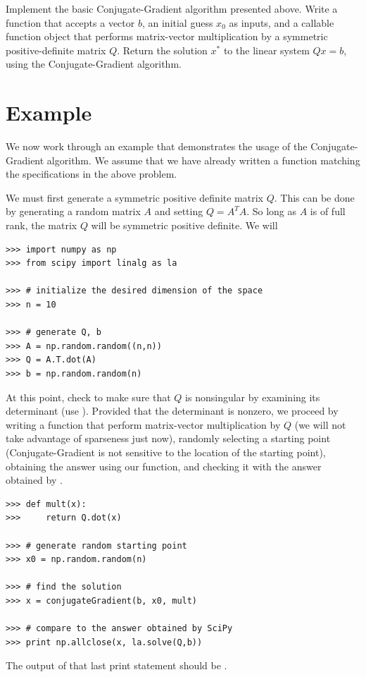 \begin{problem}
Implement the basic Conjugate-Gradient algorithm presented above. Write a function  that accepts a vector $b$, an initial 
guess $x_0$ as inputs, and a callable function
object that performs matrix-vector multiplication by a symmetric positive-definite matrix $Q$. 
Return the solution $x^*$ to the linear system $Qx = b$, using the Conjugate-Gradient algorithm.
\end{problem}

\section*{Example}
We now work through an example that demonstrates the usage of the Conjugate-Gradient algorithm. We assume that we have already written a
function  matching the specifications in the above problem.

We must first generate a symmetric positive definite matrix $Q$. This can be done by generating a random matrix $A$ and setting $Q = A^TA$.
So long as $A$ is of full rank, the matrix $Q$ will be symmetric positive definite. We will 
\begin{lstlisting}
>>> import numpy as np
>>> from scipy import linalg as la

>>> # initialize the desired dimension of the space
>>> n = 10

>>> # generate Q, b
>>> A = np.random.random((n,n))
>>> Q = A.T.dot(A)
>>> b = np.random.random(n)
\end{lstlisting}
At this point, check to make sure that $Q$ is nonsingular by examining its determinant (use ).
Provided that the determinant is nonzero, we proceed by writing a function that perform matrix-vector multiplication by $Q$ (we
will not take advantage of sparseness just now), randomly selecting a starting point (Conjugate-Gradient is not sensitive to the location of
the starting point), obtaining the answer using our function, and checking it with the answer obtained by .
\begin{lstlisting}
>>> def mult(x):
>>>     return Q.dot(x)

>>> # generate random starting point
>>> x0 = np.random.random(n)

>>> # find the solution
>>> x = conjugateGradient(b, x0, mult)

>>> # compare to the answer obtained by SciPy
>>> print np.allclose(x, la.solve(Q,b))
\end{lstlisting}  
The output of that last print statement should be . 

